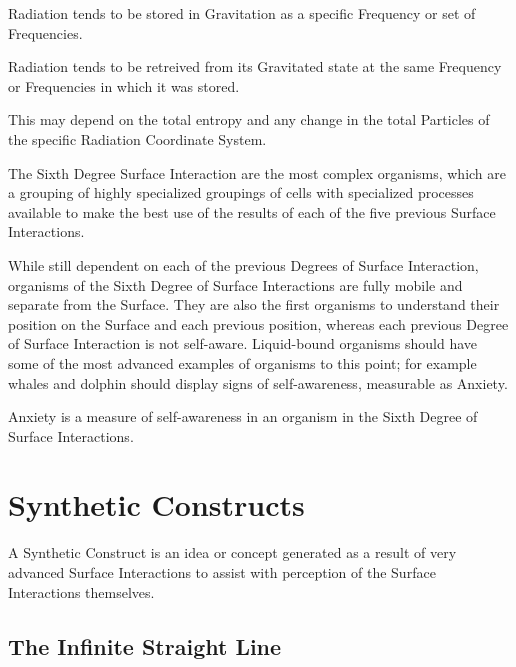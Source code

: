 \documentclass[12pt]{article}
\begin{document}
\begin{thm}
   Radiation tends to be stored in Gravitation as a specific Frequency or set of Frequencies.
\end{thm}

\begin{thm}
   Radiation tends to be retreived from its Gravitated state at the same Frequency or Frequencies in which it was stored.
\end{thm}

This may depend on the total entropy and any change in the total Particles of the specific Radiation Coordinate System.


\begin{defn}
   The Sixth Degree Surface Interaction are the most complex organisms, which are a grouping of highly specialized groupings of cells with specialized processes available to make the best use of the results of each of the five previous Surface Interactions.
\end{defn}

While still dependent on each of the previous Degrees of Surface Interaction, organisms of the Sixth Degree of Surface Interactions are fully mobile and separate from the Surface. They are also the first organisms to understand their position on the Surface and each previous position, whereas each previous Degree of Surface Interaction is not self-aware. Liquid-bound organisms should have some of the most advanced examples of organisms to this point; for example whales and dolphin should display signs of self-awareness, measurable as Anxiety. 

\begin{thm}
   Anxiety is a measure of self-awareness in an organism in the Sixth Degree of Surface Interactions.
\end{thm}






\newpage
\section*{Synthetic Constructs}

\begin{defn}
   A Synthetic Construct is an idea or concept generated as a result of very advanced Surface Interactions to assist with perception of the Surface Interactions themselves.
\end{defn}


\subsection{The Infinite Straight Line}
\end{document}
